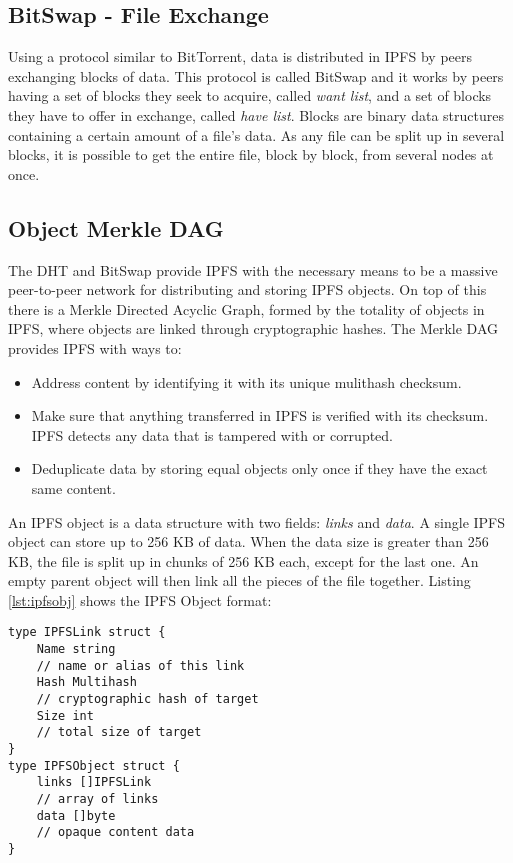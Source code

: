\documentclass[12pt]{report}
\begin{document}
\subsection{BitSwap - File Exchange}
\label{sec:bitswap}

Using a protocol similar to BitTorrent, data is distributed in IPFS by peers exchanging blocks of data. This protocol is called BitSwap and it works by peers having a set of blocks they seek to acquire, called \textit{want list}, and a set of blocks they have to offer in exchange, called \textit{have list}. Blocks are binary data structures containing a certain amount of a file's data. As any file can be split up in several blocks, it is possible to get the entire file, block by block, from several nodes at once.

\subsection{Object Merkle DAG}
The DHT and BitSwap provide IPFS with the necessary means to be a massive peer-to-peer network for distributing and storing IPFS objects. On top of this there is a Merkle Directed Acyclic Graph, formed by the totality of objects in IPFS, where objects are linked through cryptographic hashes. The Merkle DAG provides IPFS with ways to:
\begin{itemize}
\item Address content by identifying it with its unique mulithash checksum.
\item Make sure that anything transferred in IPFS is verified with its checksum. IPFS detects any data that is tampered with or corrupted.
\item Deduplicate data by storing equal objects only once if they have the exact same content.
\end{itemize}

An IPFS object is a data structure with two fields: \textit{links} and \textit{data}. A single
IPFS object can store up to 256 KB of data. When the data size is greater than 256 KB, the file is split up in
chunks of 256 KB each, except for the last one. An empty parent object will then link all the pieces of
the file together. Listing \ref{lst:ipfsobj} shows the IPFS Object format:


\begin{lstlisting}
type IPFSLink struct {
    Name string
    // name or alias of this link
    Hash Multihash
    // cryptographic hash of target
    Size int
    // total size of target
}
type IPFSObject struct {
    links []IPFSLink
    // array of links
    data []byte
    // opaque content data
}
\end{lstlisting}
\end{document}
